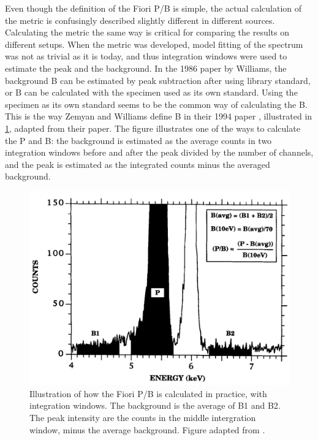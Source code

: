 Even though the definition of the Fiori P/B is simple, the actual calculation of the metric is confusingly described slightly different in different sources.
Calculating the metric the same way is critical for comparing the results on different setups.
When the metric was developed, model fitting of the spectrum was not as trivial as it is today, and thus integration windows were used to estimate the peak and the background.
In the 1986 paper by Williams, the background B can be estimated by peak subtraction after using library standard, or B can be calculated with the specimen used as its own standard.
Using the specimen as its own standard seems to be the common way of calculating the B.
This is the way Zemyan and Williams define B in their 1994 paper \cite{zemyan_standard_performance_1994}, illustrated in  \cref{fig:fiori_pb_reality}, adapted from their paper.
The figure illustrates one of the ways to calculate the P and B: the background is estimated as the average counts in two integration windows before and after the peak divided by the number of channels, and the peak is estimated as the integrated counts minus the averaged background.



\begin{figure}[htbp]
    \centering
    \includegraphics[width=0.8\linewidth]{figures/FioriPB_reality_TODO_remake.png}
    \caption{
        Illustration of how the Fiori P/B is calculated in practice, with integration windows.
        The background is the average of B1 and B2.
        The peak intensity are the counts in the middle intergration window, minus the average background.
        Figure adapted from \cite{zemyan_standard_performance_1994}.
    }
    \label{fig:fiori_pb_reality}
\end{figure}



